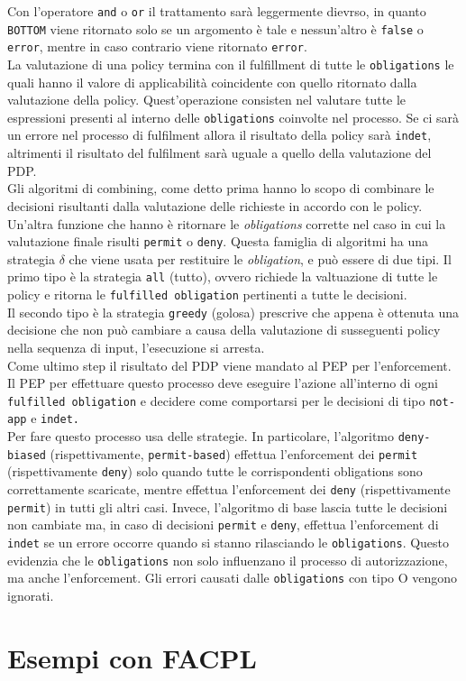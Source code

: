 Con l'operatore \texttt{and} o \texttt{or} il trattamento sarà leggermente dievrso, in quanto \texttt{BOTTOM} viene ritornato solo se un argomento è tale e nessun'altro è \texttt{false} o \texttt{error}, mentre in caso contrario viene ritornato \texttt{error}.\\
La valutazione di una policy termina con il fulfillment di tutte le \texttt{obligations} le quali hanno il valore di applicabilità coincidente con quello ritornato dalla valutazione della policy. Quest'operazione consisten nel valutare tutte le espressioni presenti al interno delle \texttt{obligations} coinvolte nel processo. Se ci sarà un errore nel processo di fulfilment allora il risultato della policy sarà \texttt{indet}, altrimenti il risultato del fulfilment sarà uguale a quello della valutazione del PDP.\\
Gli algoritmi di combining, come detto prima hanno lo scopo di combinare le decisioni risultanti dalla valutazione delle richieste in accordo con le policy. Un'altra funzione che hanno è ritornare le \textit{obligations} corrette nel caso in cui la valutazione finale risulti \texttt{permit} o \texttt{deny}. Questa famiglia di algoritmi ha una strategia $\delta$ che viene usata per restituire le \textit{obligation}, e può essere di due tipi.
Il primo tipo è la strategia \texttt{all} (tutto), ovvero richiede la valtuazione di tutte le policy e ritorna le \texttt{fulfilled obligation} pertinenti a tutte le decisioni.\\
Il secondo tipo è la strategia \texttt{greedy} (golosa) prescrive che appena è ottenuta una decisione che non può cambiare a causa della valutazione di susseguenti policy nella sequenza di input, l'esecuzione si arresta.\\
Come ultimo step il risultato del PDP viene mandato al PEP per l'enforcement.
Il PEP per effettuare questo processo deve eseguire l'azione all'interno di ogni \texttt{fulfilled obligation} e decidere come comportarsi per le decisioni di tipo \texttt{not-app} e \texttt{indet.}\\
Per fare questo processo usa delle strategie. In particolare, l'algoritmo \texttt{deny-biased} (rispettivamente, \texttt{permit-based}) effettua l'enforcement dei \texttt{permit} (rispettivamente \texttt{deny}) solo quando tutte le corrispondenti obligations sono correttamente scaricate, mentre effettua l'enforcement dei \texttt{deny} (rispettivamente \texttt{permit}) in tutti gli altri casi. Invece, l'algoritmo di base lascia tutte le decisioni non cambiate ma, in caso di decisioni \texttt{permit} e \texttt{deny}, effettua l'enforcement di \texttt{indet} se un errore occorre quando si stanno rilasciando le \texttt{obligations}. Questo evidenzia che le \texttt{obligations} non solo influenzano il processo di autorizzazione, ma anche l'enforcement. Gli errori causati dalle \texttt{obligations} con tipo O vengono ignorati.

\section{Esempi con FACPL}
\label{sec:esempi_facpl}
